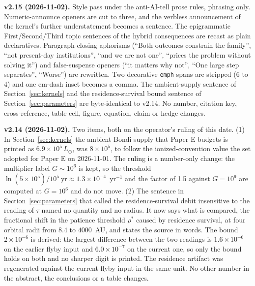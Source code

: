 \documentclass[11pt]{article}
\begin{document}
\textbf{v2.15 (2026-11-02).} Style pass under the anti-AI-tell prose rules, phrasing only. Numeric-announce openers are cut to three, and the verbless announcement of the kernel's further understatement becomes a sentence. The epigrammatic First/Second/Third topic sentences of the hybrid consequences are recast as plain declaratives. Paragraph-closing aphorisms (``Both outcomes constrain the family'', ``not present-day institutions'', ``and we are not one'', ``prices the problem without solving it'') and false-suspense openers (``it matters why not'', ``One large step separates'', ``Worse'') are rewritten. Two decorative \texttt{emph} spans are stripped (6 to 4) and one em-dash inset becomes a comma. The ambient-supply sentence of Section~\ref{sec:kernels} and the residence-survival bound sentence of Section~\ref{sec:parameters} are byte-identical to v2.14. No number, citation key, cross-reference, table cell, figure, equation, claim or hedge changes.

\textbf{v2.14 (2026-11-02).} Two items, both on the operator's ruling of this date. (1) In Section~\ref{sec:kernels} the ambient Bondi supply that Paper E budgets is printed as $6.9\times10^{5}\,L_\odot$, was $8\times10^{5}$, to follow the ionized-convention value the set adopted for Paper E on 2026-11-01. The ruling is a number-only change: the multiplier label $G \sim 10^{6}$ is kept, so the threshold $\ln(5\times10^{5})/10^{5}\ \mathrm{yr} \approx 1.3\times10^{-4}$~yr$^{-1}$ and the factor of 1.5 against $G = 10^{9}$ are computed at $G = 10^{6}$ and do not move. (2) The sentence in Section~\ref{sec:parameters} that called the residence-survival debit insensitive to the reading of $\tau$ named no quantity and no radius. It now says what is compared, the fractional shift in the patience threshold $\rho^{*}$ caused by residence survival, at four orbital radii from $8.4$ to $4000$~AU, and states the source in words. The bound $2\times10^{-6}$ is derived: the largest difference between the two readings is $1.6\times10^{-6}$ on the earlier flyby input and $6.0\times10^{-7}$ on the current one, so only the bound holds on both and no sharper digit is printed. The residence artifact was regenerated against the current flyby input in the same unit. No other number in the abstract, the conclusions or a table changes.
\end{document}
